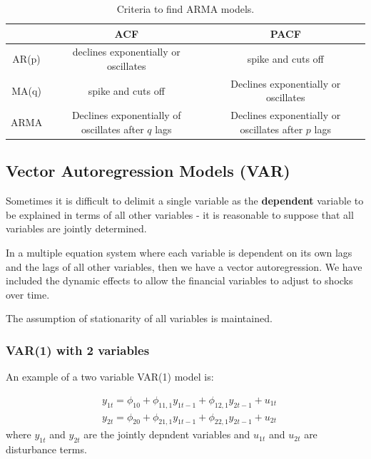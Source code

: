 \documentclass[11pt]{article}
\begin{document}
\begin{table}[ht]
    \centering
    \begin{tabular}{ |c|c|c| } 
    \hline
 & ACF & PACF \\
 \hline
 AR(p) & declines exponentially or oscillates & spike and cuts off \\ 
 \hline
 MA(q) & spike and cuts off & Declines exponentially or oscillates \\ 
 \hline
 ARMA & Declines exponentially of oscillates after $q$ lags & Declines exponentially or oscillates after $p$ lags \\ 
 \hline
\end{tabular}
    \caption{Criteria to find ARMA models.}
    \label{tab:arma table}
\end{table}

\newpage
\clearpage

\subsection{Vector Autoregression Models (VAR)}

Sometimes it is difficult to delimit a single variable as the \textbf{dependent} variable to be explained in terms of all other variables - it is reasonable to suppose that all variables are jointly determined.

In a multiple equation system where each variable is dependent on its own lags and the lags of all other variables, then we have a vector autoregression. We have included the dynamic effects to allow the financial variables to adjust to shocks over time.
\begin{note}
    The assumption of stationarity of all variables is maintained.
\end{note}

\subsubsection{VAR(1) with 2 variables}
An example of a two variable VAR(1) model is:

\begin{equation}
\begin{aligned}
& y_{1 t}=\phi_{10}+\phi_{11,1} y_{1 t-1}+\phi_{12,1} y_{2 t-1}+u_{1 t} \\
& y_{2 t}=\phi_{20}+\phi_{21,1} y_{1 t-1}+\phi_{22,1} y_{2 t-1}+u_{2 t}
\end{aligned}
\end{equation}
where $y_{1t}$ and $y_{2t}$ are the jointly depndent variables and $u_{1t}$ and $u_{2t}$ are disturbance terms.
\end{document}
